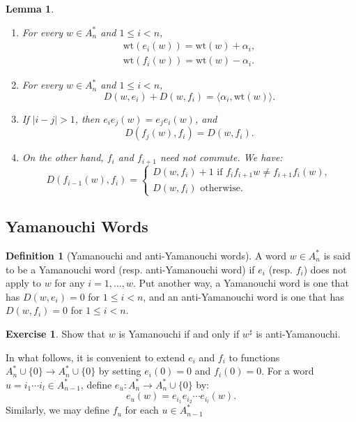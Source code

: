 \documentclass[12pt]{amsart}
\newcommand{\wt}{\mathrm{wt}}
\newcommand{\ip}[2]{\langle#1,#2\rangle}
\newtheorem{lemma}[theorem]{Lemma}
\theoremstyle{definition}
\newtheorem{definition}[theorem]{Definition}
\theoremstyle{example}
\newtheorem{exercise}[theorem]{Exercise}
\begin{document}
\begin{lemma}
  \begin{enumerate}
  \item For every $w\in A_n^*$ and $1\leq i<n$,
    \begin{gather*}
      \wt(e_i(w)) = \wt(w)+\alpha_i,\\
      \wt(f_i(w)) = \wt(w)-\alpha_i.
    \end{gather*}
  \item For every $w\in A_n^*$ and $1\leq i<n$,
  \begin{displaymath}
    D(w,e_i)+D(w,f_i)=\ip{\alpha_i}{\wt(w)}.
  \end{displaymath}
  \item If $|i-j|>1$, then $e_ie_j(w)=e_je_i(w)$, and
  \begin{displaymath}
    D(f_j(w),f_i)=D(w,f_i).
  \end{displaymath}
  \item
    On the other hand, $f_i$ and $f_{i+1}$ need not commute.
    We have:
    \begin{displaymath}
      D(f_{i-1}(w),f_i)=
      \begin{cases}
        D(w,f_i)+1 \text{ if $f_if_{i+1}w\neq f_{i+1}f_i(w)$},\\
        D(w,f_i) \text{ otherwise}.
      \end{cases}
    \end{displaymath}
  \end{enumerate}
\end{lemma}

\subsection{Yamanouchi Words}
\label{sec:yamanouchi-words}

\begin{definition}
  [Yamanouchi and anti-Yamanouchi words]
  A word $w\in A_n^*$ is said to be a Yamanouchi word (resp. anti-Yamanouchi word) if $e_i$ (resp. $f_i$) does not apply to $w$ for any $i=1,\dotsc,w$.
  Put another way, a Yamanouchi word is one that has $D(w,e_i)=0$ for $1\leq i<n$, and an anti-Yamanouchi word is one that has $D(w,f_i)=0$ for $1\leq i<n$.
\end{definition}
\begin{exercise}
  Show that $w$ is Yamanouchi if and only if $w^\sharp$ is anti-Yamanouchi.
\end{exercise}
In what follows, it is convenient to extend $e_i$ and $f_i$ to functions $A_n^*\cup\{0\}\to A_n^*\cup\{0\}$ by setting $e_i(0)=0$ and $f_i(0)=0$.
For a word $u=i_1\dotsb i_l\in A_{n-1}^*$, define $e_u:A_n^*\to A_n^*\cup\{0\}$ by:
\begin{displaymath}
  e_u(w)=e_{i_1}e_{i_2}\dotsb e_{i_l}(w).
\end{displaymath}
Similarly, we may define $f_u$ for each $u\in A_{n-1}^*$
\end{document}
